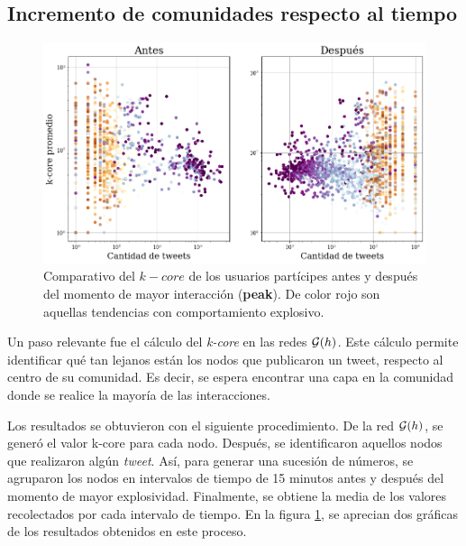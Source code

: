 \documentclass[../main.tex]{subfiles}
\begin{document}
\newpage
\subsection{Incremento de comunidades  respecto al tiempo}

\begin{figure}[h!]
    \centering
    \includegraphics[scale = 0.37]{images/resultados_peakKcore.png}
    \caption{Comparativo del $k-core$ de los usuarios partícipes antes y después del momento de mayor interacción (\textbf{peak}). De color rojo son aquellas tendencias con comportamiento explosivo. }
    \label{fig:resultados_kcoregrafico}
\end{figure}


Un paso relevante fue el cálculo del \textit{k-core} en las redes $\mathcal{G}(h)$. Este cálculo permite identificar qué tan lejanos están los nodos que publicaron un tweet, respecto al centro de su comunidad. Es decir, se espera encontrar una capa en la comunidad donde se realice la mayoría de las  interacciones. 


Los resultados se obtuvieron con el siguiente procedimiento. De la red $\mathcal{G}(h)$, se generó el valor k-core para cada nodo. Después, se identificaron aquellos nodos que realizaron algún \textit{tweet}. Así, para generar una sucesión de números, se agruparon los nodos en intervalos de tiempo de 15 minutos antes y después del momento de mayor explosividad. Finalmente, se obtiene la media de los valores recolectados por cada intervalo de tiempo. En la figura \ref{fig:resultados_kcoregrafico}, se aprecian dos gráficas de los resultados obtenidos en este proceso. 
\end{document}
